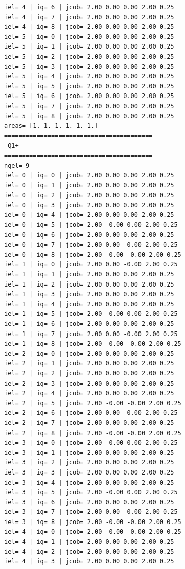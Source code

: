 \begin{tiny}
\begin{verbatim}
iel= 4 | iq= 6 | jcob= 2.00 0.00 0.00 2.00 0.25
iel= 4 | iq= 7 | jcob= 2.00 0.00 0.00 2.00 0.25
iel= 4 | iq= 8 | jcob= 2.00 0.00 0.00 2.00 0.25
iel= 5 | iq= 0 | jcob= 2.00 0.00 0.00 2.00 0.25
iel= 5 | iq= 1 | jcob= 2.00 0.00 0.00 2.00 0.25
iel= 5 | iq= 2 | jcob= 2.00 0.00 0.00 2.00 0.25
iel= 5 | iq= 3 | jcob= 2.00 0.00 0.00 2.00 0.25
iel= 5 | iq= 4 | jcob= 2.00 0.00 0.00 2.00 0.25
iel= 5 | iq= 5 | jcob= 2.00 0.00 0.00 2.00 0.25
iel= 5 | iq= 6 | jcob= 2.00 0.00 0.00 2.00 0.25
iel= 5 | iq= 7 | jcob= 2.00 0.00 0.00 2.00 0.25
iel= 5 | iq= 8 | jcob= 2.00 0.00 0.00 2.00 0.25
areas= [1. 1. 1. 1. 1. 1.]
=========================================
 Q1+
=========================================
nqel= 9
iel= 0 | iq= 0 | jcob= 2.00 0.00 0.00 2.00 0.25
iel= 0 | iq= 1 | jcob= 2.00 0.00 0.00 2.00 0.25
iel= 0 | iq= 2 | jcob= 2.00 0.00 0.00 2.00 0.25
iel= 0 | iq= 3 | jcob= 2.00 0.00 0.00 2.00 0.25
iel= 0 | iq= 4 | jcob= 2.00 0.00 0.00 2.00 0.25
iel= 0 | iq= 5 | jcob= 2.00 -0.00 0.00 2.00 0.25
iel= 0 | iq= 6 | jcob= 2.00 0.00 0.00 2.00 0.25
iel= 0 | iq= 7 | jcob= 2.00 0.00 -0.00 2.00 0.25
iel= 0 | iq= 8 | jcob= 2.00 -0.00 -0.00 2.00 0.25
iel= 1 | iq= 0 | jcob= 2.00 0.00 -0.00 2.00 0.25
iel= 1 | iq= 1 | jcob= 2.00 0.00 0.00 2.00 0.25
iel= 1 | iq= 2 | jcob= 2.00 0.00 0.00 2.00 0.25
iel= 1 | iq= 3 | jcob= 2.00 0.00 0.00 2.00 0.25
iel= 1 | iq= 4 | jcob= 2.00 0.00 0.00 2.00 0.25
iel= 1 | iq= 5 | jcob= 2.00 -0.00 0.00 2.00 0.25
iel= 1 | iq= 6 | jcob= 2.00 0.00 0.00 2.00 0.25
iel= 1 | iq= 7 | jcob= 2.00 0.00 -0.00 2.00 0.25
iel= 1 | iq= 8 | jcob= 2.00 -0.00 -0.00 2.00 0.25
iel= 2 | iq= 0 | jcob= 2.00 0.00 0.00 2.00 0.25
iel= 2 | iq= 1 | jcob= 2.00 0.00 0.00 2.00 0.25
iel= 2 | iq= 2 | jcob= 2.00 0.00 0.00 2.00 0.25
iel= 2 | iq= 3 | jcob= 2.00 0.00 0.00 2.00 0.25
iel= 2 | iq= 4 | jcob= 2.00 0.00 0.00 2.00 0.25
iel= 2 | iq= 5 | jcob= 2.00 -0.00 -0.00 2.00 0.25
iel= 2 | iq= 6 | jcob= 2.00 0.00 -0.00 2.00 0.25
iel= 2 | iq= 7 | jcob= 2.00 0.00 0.00 2.00 0.25
iel= 2 | iq= 8 | jcob= 2.00 -0.00 -0.00 2.00 0.25
iel= 3 | iq= 0 | jcob= 2.00 -0.00 0.00 2.00 0.25
iel= 3 | iq= 1 | jcob= 2.00 0.00 0.00 2.00 0.25
iel= 3 | iq= 2 | jcob= 2.00 0.00 0.00 2.00 0.25
iel= 3 | iq= 3 | jcob= 2.00 0.00 0.00 2.00 0.25
iel= 3 | iq= 4 | jcob= 2.00 0.00 0.00 2.00 0.25
iel= 3 | iq= 5 | jcob= 2.00 -0.00 0.00 2.00 0.25
iel= 3 | iq= 6 | jcob= 2.00 0.00 0.00 2.00 0.25
iel= 3 | iq= 7 | jcob= 2.00 0.00 -0.00 2.00 0.25
iel= 3 | iq= 8 | jcob= 2.00 -0.00 -0.00 2.00 0.25
iel= 4 | iq= 0 | jcob= 2.00 -0.00 -0.00 2.00 0.25
iel= 4 | iq= 1 | jcob= 2.00 0.00 0.00 2.00 0.25
iel= 4 | iq= 2 | jcob= 2.00 0.00 0.00 2.00 0.25
iel= 4 | iq= 3 | jcob= 2.00 0.00 0.00 2.00 0.25

\end{verbatim}
\end{tiny}
